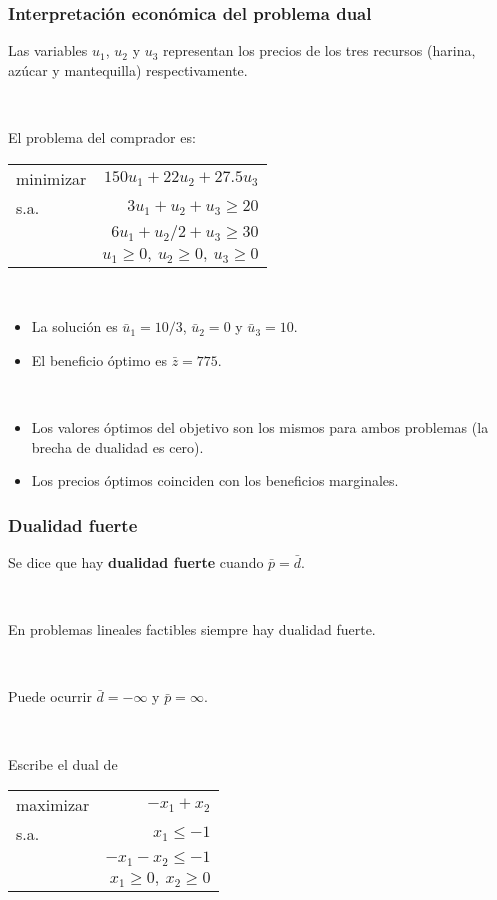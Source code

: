 \documentclass{beamer}
\begin{document}
\begin{frame}
\frametitle{Interpretación económica del problema dual}

Las variables $u_1$, $u_2$ y $u_3$ representan los precios de los tres recursos (harina, azúcar y mantequilla) respectivamente.

\

El problema del comprador es:

\begin{center}
\begin{tabular}{lr}
minimizar & $150u_1 + 22u_2 + 27.5u_3$ \\
s.a. & $3u_1+u_2 + u_3 \geq 20$    \\
	 & $6u_1 + u_2/2 + u_3 \geq 30$  \\
	 & $u_1\geq 0,\ u_2\geq 0,\ u_3\geq 0$
\end{tabular}
\end{center}

\

\begin{itemize}
\item La solución es $\bar{u}_1=10/3$, $\bar{u}_2=0$ y $\bar{u}_3=10$.
\item El beneficio óptimo es $\bar{z}=775$.
\end{itemize}


\

\begin{itemize}
\item Los valores óptimos del objetivo son los mismos para ambos problemas (la brecha de dualidad es cero).
\item Los precios óptimos coinciden con los beneficios marginales.
\end{itemize}

\end{frame}
\begin{frame}
\frametitle{Dualidad fuerte}

Se dice que hay \textbf{dualidad fuerte} cuando $\bar{p}=\bar{d}$. 

\

En problemas lineales factibles siempre hay dualidad fuerte.


\

Puede ocurrir $\bar{d}=-\infty$ y $\bar{p}=\infty$.

\

Escribe el dual de 

\begin{center}
\begin{tabular}{lr}
maximizar & $-x_1 + x_2$ \\
s.a. & $x_1 \leq -1$    \\
	 & $-x_1 - x_2 \leq -1$  \\
	 & $x_1\geq 0,\ x_2\geq 0$
\end{tabular}
\end{center}

\end{frame}
\end{document}
